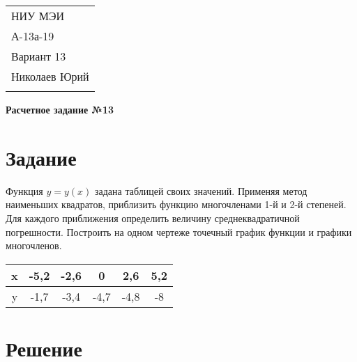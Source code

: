 \documentclass[a4paper,12pt]{article} %
\begin{document}
\thispagestyle{empty} 

\begin{tabular}{p{15.5cm}} 
НИУ МЭИ \\ А-13а-19  \\ Вариант 13 \\ Николаев Юрий\\
\hline 
\\
\end{tabular} 

\vspace*{0.3cm}

\begin{center} 
	{\Large \bf Расчетное задание №13} 
	\vspace{2mm}
\end{center}  

\vspace{0.4cm}


\section{Задание}
Функция $y = y(x)$ задана таблицей своих значений. Применяя метод наименьших квадратов, приблизить функцию многочленами 1-й и 2-й степеней. Для каждого приближения определить величину среднеквадратичной погрешности. Построить на одном чертеже точечный график функции и графики многочленов.

\begin{center}
\begin{tabular}{| c | c | c | c | c | c |}
\hline
    x & -5,2 & -2,6 & 0 & 2,6 & 5,2 \\ \hline
    y & -1,7 & -3,4 & -4,7 & -4,8 & -8 \\
\hline
\end{tabular}
\end{center}

\section{Решение}
\end{document}

